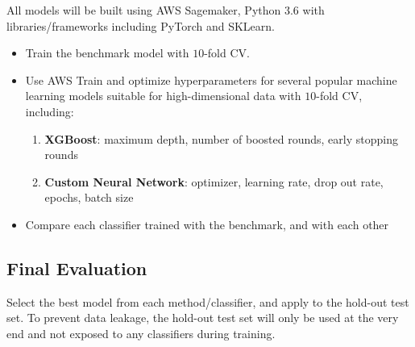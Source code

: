 \documentclass[11pt]{diazessay}
\begin{document}
All models will be built using AWS Sagemaker, Python 3.6 with libraries/frameworks including PyTorch and SKLearn.

\begin{itemize}
	\item Train the benchmark model with $10$-fold CV.
	\item Use AWS Train and optimize hyperparameters for several popular machine learning models suitable for high-dimensional data with $10$-fold CV, including: 
	\begin{enumerate}
		\item \textbf{XGBoost}: maximum depth, number of boosted rounds, early stopping rounds
		\item \textbf{Custom Neural Network}: optimizer, learning rate, drop out rate, epochs, batch size
	\end{enumerate}
	\item Compare each classifier trained with the benchmark, and with each other
\end{itemize} 

\subsection{Final Evaluation}

Select the best model from each method/classifier, and apply to the hold-out test set. To prevent data leakage, the hold-out test set will only be used at the very end and not exposed to any classifiers during training. 

\vskip0.4in



\end{document}
